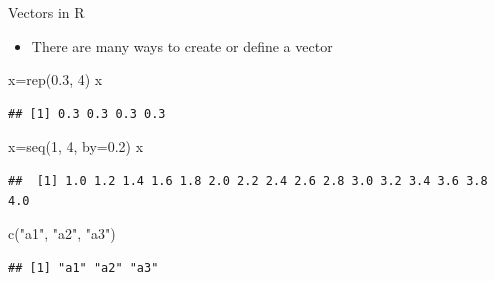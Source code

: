 \documentclass[
  ignorenonframetext,
]{beamer}
\newenvironment{Shaded}{\begin{snugshade}}{\end{snugshade}}
\newcommand{\AttributeTok}[1]{\textcolor[rgb]{0.77,0.63,0.00}{#1}}
\newcommand{\DecValTok}[1]{\textcolor[rgb]{0.00,0.00,0.81}{#1}}
\newcommand{\FloatTok}[1]{\textcolor[rgb]{0.00,0.00,0.81}{#1}}
\newcommand{\FunctionTok}[1]{\textcolor[rgb]{0.00,0.00,0.00}{#1}}
\newcommand{\NormalTok}[1]{#1}
\newcommand{\OtherTok}[1]{\textcolor[rgb]{0.56,0.35,0.01}{#1}}
\newcommand{\StringTok}[1]{\textcolor[rgb]{0.31,0.60,0.02}{#1}}
\providecommand{\tightlist}{%
  \setlength{\itemsep}{0pt}\setlength{\parskip}{0pt}}
\begin{document}
\begin{frame}[fragile]{Vectors in R}
\protect\hypertarget{vectors-in-r}{}
\begin{itemize}
\tightlist
\item
  There are many ways to create or define a vector
\end{itemize}

\begin{Shaded}
\begin{Highlighting}[]
\NormalTok{x}\OtherTok{=}\FunctionTok{rep}\NormalTok{(}\FloatTok{0.3}\NormalTok{, }\DecValTok{4}\NormalTok{)}
\NormalTok{x}
\end{Highlighting}
\end{Shaded}

\begin{verbatim}
## [1] 0.3 0.3 0.3 0.3
\end{verbatim}

\begin{Shaded}
\begin{Highlighting}[]
\NormalTok{x}\OtherTok{=}\FunctionTok{seq}\NormalTok{(}\DecValTok{1}\NormalTok{, }\DecValTok{4}\NormalTok{, }\AttributeTok{by=}\FloatTok{0.2}\NormalTok{)}
\NormalTok{x}
\end{Highlighting}
\end{Shaded}

\begin{verbatim}
##  [1] 1.0 1.2 1.4 1.6 1.8 2.0 2.2 2.4 2.6 2.8 3.0 3.2 3.4 3.6 3.8 4.0
\end{verbatim}

\begin{Shaded}
\begin{Highlighting}[]
\FunctionTok{c}\NormalTok{(}\StringTok{"a1"}\NormalTok{, }\StringTok{"a2"}\NormalTok{, }\StringTok{"a3"}\NormalTok{)}
\end{Highlighting}
\end{Shaded}

\begin{verbatim}
## [1] "a1" "a2" "a3"
\end{verbatim}
\end{frame}
\end{document}
